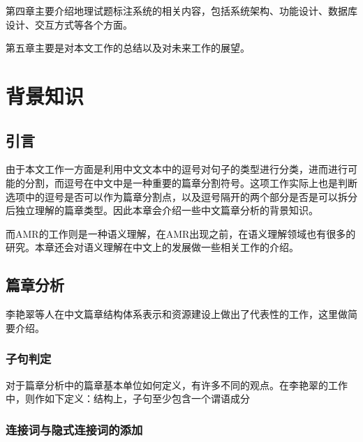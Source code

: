 \documentclass[master, winfont]{njuthesis}
\begin{document}
第四章主要介绍地理试题标注系统的相关内容，包括系统架构、功能设计、数据库设计、交互方式等各个方面。

第五章主要是对本文工作的总结以及对未来工作的展望。

\chapter{背景知识}
\section{引言}


由于本文工作一方面是利用中文文本中的逗号对句子的类型进行分类，进而进行可能的分割，而逗号在中文中是一种重要的篇章分割符号。这项工作实际上也是判断选项中的逗号是否可以作为篇章分割点，以及逗号隔开的两个部分是否是可以拆分后独立理解的篇章类型。因此本章会介绍一些中文篇章分析的背景知识。

而AMR的工作则是一种语义理解，在AMR出现之前，在语义理解领域也有很多的研究。本章还会对语义理解在中文上的发展做一些相关工作的介绍。

\section{篇章分析}
李艳翠等人\cite{liyancui2015}在中文篇章结构体系表示和资源建设上做出了代表性的工作，这里做简要介绍。

\subsection{子句判定}
对于篇章分析中的篇章基本单位如何定义，有许多不同的观点。在李艳翠的工作中，则作如下定义：结构上，子句至少包含一个谓语成分

\subsection{连接词与隐式连接词的添加}
\end{document}
